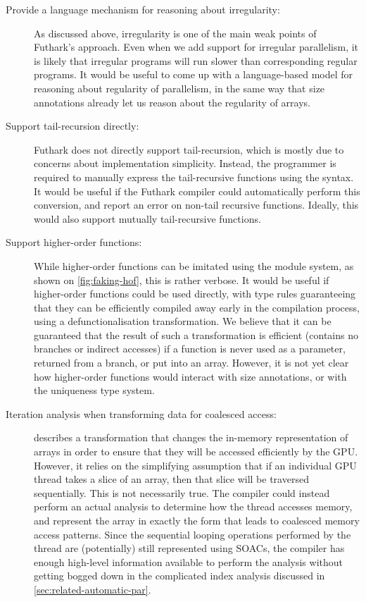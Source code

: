\begin{description}
\item[Provide a language mechanism for reasoning about irregularity:]
  As discussed above, irregularity is one of the main weak points of
  Futhark's approach.  Even when we add support for irregular
  parallelism, it is likely that irregular programs will run slower
  than corresponding regular programs.  It would be useful to come up
  with a language-based model for reasoning about regularity of
  parallelism, in the same way that size annotations already let us
  reason about the regularity of arrays.

\item[Support tail-recursion directly:] Futhark does not directly
  support tail-recursion, which is mostly due to concerns about
  implementation simplicity.  Instead, the programmer is required to
  manually express the tail-recursive functions using the 
  syntax.  It would be useful if the Futhark compiler could
  automatically perform this conversion, and report an error on
  non-tail recursive functions.  Ideally, this would also support
  mutually tail-recursive functions.

\item[Support higher-order functions:] While higher-order functions
  can be imitated using the module system, as shown on
  \cref{fig:faking-hof}, this is rather verbose.  It would be useful
  if higher-order functions could be used directly, with type rules
  guaranteeing that they can be efficiently compiled away early in the
  compilation process, using a defunctionalisation transformation.  We
  believe that it can be guaranteed that the result of such a
  transformation is efficient (contains no branches or indirect
  accesses) if a function is never used as a  parameter,
  returned from a branch, or put into an array.  However, it is not
  yet clear how higher-order functions would interact with size
  annotations, or with the uniqueness type system.

\item[Iteration analysis when transforming data for coalesced access:]
   describes a transformation that
  changes the in-memory representation of arrays in order to ensure
  that they will be accessed efficiently by the GPU.  However, it
  relies on the simplifying assumption that if an individual GPU
  thread takes a slice of an array, then that slice will be traversed
  sequentially.  This is not necessarily true.  The compiler could
  instead perform an actual analysis to determine how the thread
  accesses memory, and represent the array in exactly the form that
  leads to coalesced memory access patterns.  Since the sequential
  looping operations performed by the thread are (potentially) still
  represented using SOACs, the compiler has enough high-level
  information available to perform the analysis without getting bogged
  down in the complicated index analysis discussed in
  \cref{sec:related-automatic-par}.


\end{description}

